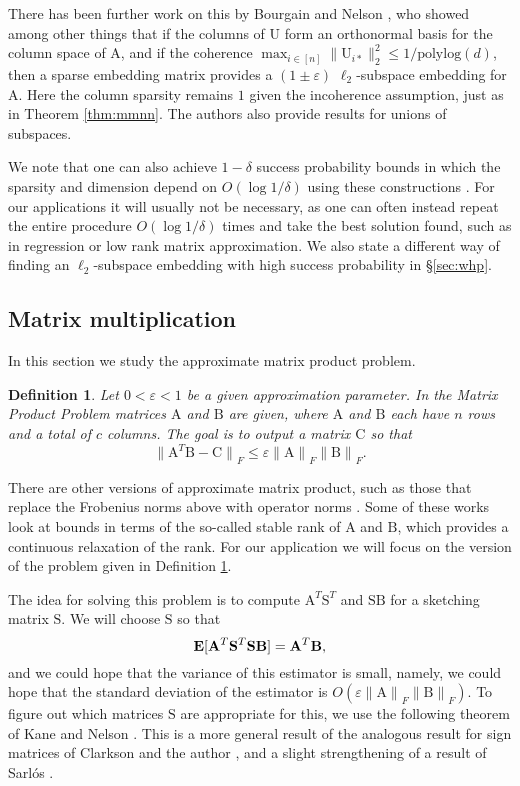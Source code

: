 \documentclass[11pt]{article}
\newtheorem{definition}[theorem]{Definition}
\newcommand{\mat}[1]{{\ensuremath{\bm{\mathrm{#1}}}}}
\def\matA{\mat{A}}
\def\matB{\mat{B}}
\def\matC{\mat{C}}
\def\matS{\mat{S}}
\def\matU{\mat{U}}
\newcommand{\normF}[1]{{\| #1 \|}_F}
\newcommand{\eps}{\varepsilon}
\newcommand{\polylog}{{\mathrm{polylog}}}
\begin{document}
There has been further work on this by Bourgain and Nelson \cite{bn13}, 
who showed among other things that 
if the columns of $\matU$ form an orthonormal basis for the column space of $\matA$, and
if the coherence $\max_{i \in [n]}\|\matU_{i*}\|_2^2 \leq 1/\polylog(d)$, then a sparse embedding
matrix provides a $(1 \pm \eps)$ $\ell_2$-subspace embedding for $\matA$. Here the column sparsity
remains $1$ given the incoherence assumption, just as in Theorem \ref{thm:mmnn}. The authors also
provide results for unions of subspaces. 

We note that one can also achieve $1-\delta$ success
probability 
bounds in which the sparsity and dimension depend on $O(\log 1/\delta)$ using 
these constructions \cite{CW13,MM13,JH13}. For our
applications it will usually not be necessary, as one can often instead repeat the entire procedure $O(\log 1/\delta)$
times and take the best solution found, such as in regression or low rank matrix approximation. 
We also state a different
way of finding an $\ell_2$-subspace embedding with high success probability in \S\ref{sec:whp}.

\subsection{Matrix multiplication}\label{sec:mm}
In this section we study the approximate matrix product problem. 

\begin{definition}\label{def:matrixProduct}
Let $0 < \eps < 1$ be a given approximation parameter. 
In the {\em Matrix Product} Problem matrices $\matA$ and $\matB$ are given, 
where $\matA$ and $\matB$ each have $n$ rows and a 
total of $c$ columns.  
The goal is to output a 
matrix $\matC$ so that 
\[
\normF{\matA^T \matB - \matC} \leq \varepsilon \normF{\matA} \normF{\matB}.
\]
\end{definition}
There are other versions of approximate matrix product, such as those that replace the Frobenius norms
above with operator norms \cite{Zou10,malik11,CEMMP14,CNW14}. 
Some of these works look at
bounds in terms of the so-called stable rank of $\matA$ and $\matB$, which
provides a continuous relaxation of the rank. 
For our application we will focus on the version of the
problem given in Definition \ref{def:matrixProduct}. 

The idea for solving this problem is to compute $\matA^T \matS^T$ and $\matS \matB$ 
for a sketching matrix $\matS$. We will choose $\matS$ so that
$${\bf E}[\matA^T \matS^T \matS \matB] = \matA^T \matB,$$
and we could hope that the variance of this estimator is small, namely,
we could hope that the standard deviation of the estimator is $O(\varepsilon \normF{\matA} \normF{\matB})$. 
To figure out which matrices $\matS$ are appropriate for this,
we use the following theorem of Kane and Nelson \cite{kn14}. This is a more general result of the 
analogous result for sign matrices of Clarkson and the author \cite{CW09}, and a slight strengthening 
of a result of Sarl\'{o}s \cite{S06}. 
\end{document}
